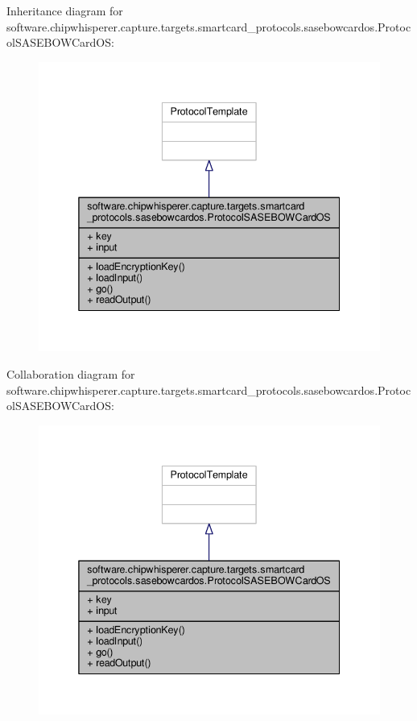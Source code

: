 Inheritance diagram for software.\+chipwhisperer.\+capture.\+targets.\+smartcard\+\_\+protocols.\+sasebowcardos.\+Protocol\+S\+A\+S\+E\+B\+O\+W\+Card\+O\+S\+:\nopagebreak
\begin{figure}[H]
\begin{center}
\leavevmode
\includegraphics[width=338pt]{d5/dc8/classsoftware_1_1chipwhisperer_1_1capture_1_1targets_1_1smartcard__protocols_1_1sasebowcardos_1_5ac82b6660d5464340455b1d23323830}
\end{center}
\end{figure}


Collaboration diagram for software.\+chipwhisperer.\+capture.\+targets.\+smartcard\+\_\+protocols.\+sasebowcardos.\+Protocol\+S\+A\+S\+E\+B\+O\+W\+Card\+O\+S\+:\nopagebreak
\begin{figure}[H]
\begin{center}
\leavevmode
\includegraphics[width=338pt]{dc/d30/classsoftware_1_1chipwhisperer_1_1capture_1_1targets_1_1smartcard__protocols_1_1sasebowcardos_1_7ffdffdded9535f07820b5b7cf8c2d5d}
\end{center}
\end{figure}


